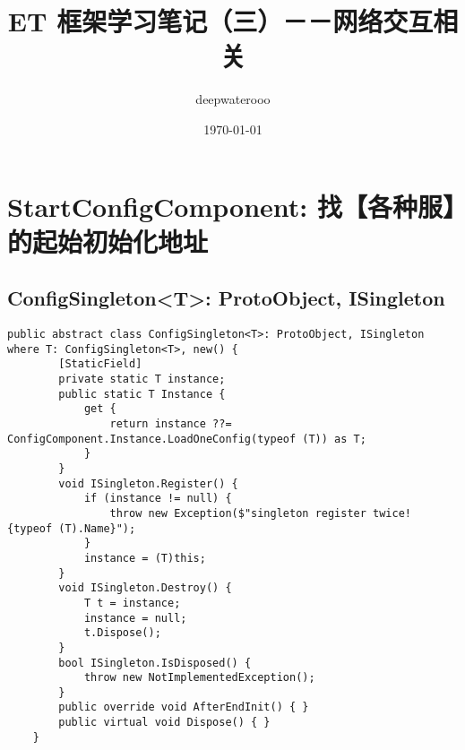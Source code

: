 \documentclass[9pt, b5paper]{article}
\author{deepwaterooo}
\date{\today}
\title{ET 框架学习笔记（三）－－网络交互相关}
\begin{document}
\maketitle
\tableofcontents


\section{StartConfigComponent: 找【各种服】的起始初始化地址}
\label{sec-1}
\subsection{ConfigSingleton<T>: ProtoObject, ISingleton}
\label{sec-1-1}
\begin{verbatim}
public abstract class ConfigSingleton<T>: ProtoObject, ISingleton where T: ConfigSingleton<T>, new() {
        [StaticField]
        private static T instance;
        public static T Instance {
            get {
                return instance ??= ConfigComponent.Instance.LoadOneConfig(typeof (T)) as T;
            }
        }
        void ISingleton.Register() {
            if (instance != null) {
                throw new Exception($"singleton register twice! {typeof (T).Name}");
            }
            instance = (T)this;
        }
        void ISingleton.Destroy() {
            T t = instance;
            instance = null;
            t.Dispose();
        }
        bool ISingleton.IsDisposed() {
            throw new NotImplementedException();
        }
        public override void AfterEndInit() { }
        public virtual void Dispose() { }
    }
\end{verbatim}
\end{document}
